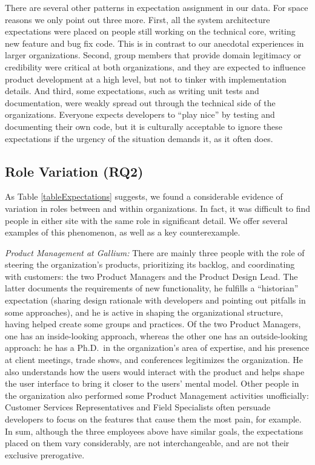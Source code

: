 \documentclass[10pt, conference, compsocconf]{IEEEtran}
\begin{document}
There are several other patterns in expectation assignment in our data. For space reasons we only point out three more. First, all the system architecture expectations were placed on people still working on the technical core, writing new feature and bug fix code. This is in contrast to our anecdotal experiences in larger organizations. Second, group members that provide domain legitimacy or credibility were critical at both organizations, and they are expected to influence product development at a high level, but not to tinker with implementation details. And third, some expectations, such as writing unit tests and documentation, were weakly spread out through the technical side of the organizations. Everyone expects developers to ``play nice'' by testing and documenting their own code, but it is culturally acceptable to ignore these expectations if the urgency of the situation demands it, as it often does.



\subsection{Role Variation (RQ2)}

As Table \ref{tableExpectations} suggests, we found a considerable evidence of variation in roles between and within organizations. In fact, it was difficult to find people in either site with the same role in significant detail. We offer several examples of this phenomenon, as well as a key counterexample.

\emph{Product Management at Gallium:} There are mainly three people with the role of steering the organization's products, prioritizing its backlog, and coordinating with customers: the two Product Managers and the Product Design Lead. The latter documents the requirements of new functionality, he fulfills a ``historian'' expectation (sharing design rationale with developers and pointing out pitfalls in some approaches), and he is active in shaping the organizational structure, having helped create some groups and practices. Of the two Product Managers, one has an inside-looking approach, whereas the other one has an outside-looking approach: he has a Ph.D.\ in the organization's area of expertise, and his presence at client meetings, trade shows, and conferences legitimizes the organization. He also understands how the users would interact with the product and helps shape the user interface to bring it closer to the users' mental model. Other people in the organization also performed some Product Management activities unofficially: Customer Services Representatives and Field Specialists often persuade developers to focus on the features that cause them the most pain, for example. In sum, although the three employees above have similar goals, the expectations placed on them vary considerably, are not interchangeable, and are not their exclusive prerogative.
\end{document}
